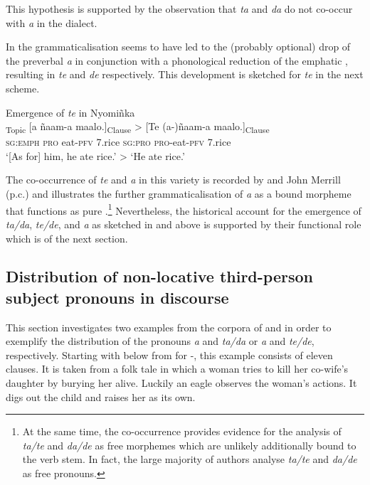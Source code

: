 \documentclass[output=paper
,newtxmath
,modfonts
,nonflat]{langsci/langscibook}
\begin{document}
This hypothesis is supported by the observation that \textit{ta} and \textit{da} do not co-occur with \textit{a} in the  dialect.

In   the grammaticalisation seems to have led to the (probably optional) drop of the preverbal \textit{a} in conjunction with a phonological reduction of the emphatic , resulting in \textit{te} and \textit{de} respectively. This development is sketched for \textit{te} in the next scheme.

\ea\label{ex:apel:15}
{Emergence of \textit{te} in  Nyomiñka}\\
\gll   [Ten]\textsubscript{Topic} [a ñaam-a maalo.]\textsubscript{Clause} > [Te (a-)ñaam-a maalo.]\textsubscript{Clause}\\
     \textsc{sg:emph} \textsc{pro} eat\textsc{-pfv} \textsc{7.}rice {} \textsc{sg:pro} \textsc{pro-}eat\textsc{-pfv} \textsc{7.}rice\\
\glt ‘[As for] him, he ate rice.’ > ‘He ate rice.’
\z

The co-occurrence of \textit{te} and \textit{a} in this variety is recorded by \citet{Renaudier2012} and John Merrill (p.c.) and illustrates the further grammaticalisation of \textit{a} as a bound morpheme that functions as pure .\footnote{At the same time, the co-occurrence provides evidence for the analysis of \textit{ta/te} and \textit{da/de} as free morphemes which are unlikely additionally bound to the verb stem. In fact, the large majority of authors analyse \textit{ta/te} and \textit{da/de} as free pronouns.} Nevertheless, the historical account for the emergence of \textit{ta/da}, \textit{te/de}, and \textit{a} as sketched in  and  above is supported by their functional role which is  of the next section. 

\subsection{Distribution of non-locative third-person subject pronouns in discourse}\label{sec:apel:2.3}

This section investigates two examples from the corpora of \citet{Faye1979} and \citet{Renaudier2012} in order to exemplify the distribution of the pronouns \textit{a} and \textit{ta/da} or \textit{a} and \textit{te/de}, respectively. Starting with  below from \citet{Faye1979} for -, this example consists of eleven clauses. It is taken from a folk tale in which a woman tries to kill her co-wife’s daughter by burying her alive. Luckily an eagle observes the woman’s actions. It digs out the child and raises her as its own.
\end{document}
